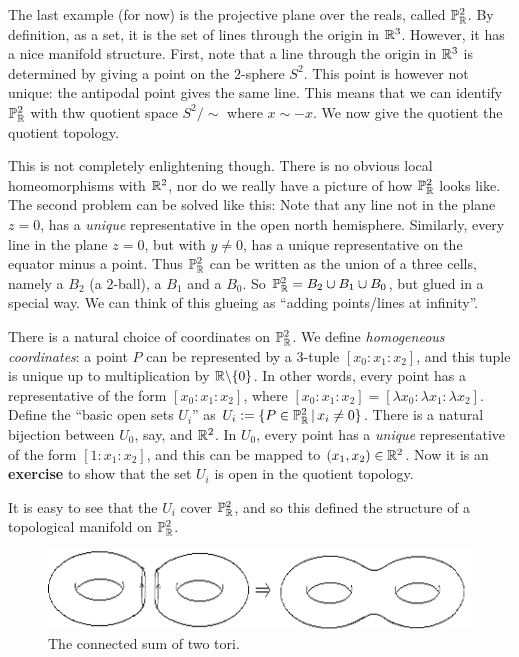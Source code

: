 \documentclass[11pt, english]{article}
\begin{document}
\begin{example}
The last example (for now) is the projective plane over the reals, called $\mathbb{P} _{\mathbb{R}} ^2$. By definition, as a set, it is the set of lines through the origin in $\mathbb{R}^3$. However, it has a nice manifold structure. First, note that a line through the origin in $\mathbb{R}^3$ is determined by giving a point on the $2$-sphere $S^2$. This point is however not unique: the antipodal point gives the same line. This means that we can identify $\mathbb{P}_{\mathbb{R}}^2$ with thw quotient space $S^2 / \sim$ where $x \sim -x$. We now give the quotient the quotient topology.

This is not completely enlightening though. There is no obvious local homeomorphisms with $\mathbb{R}^2$, nor do we really have a picture of how $\mathbb{P}_{\mathbb{R}}^2$ looks like. The second problem can be solved like this: Note that any line not in the plane $z=0$, has a \emph{unique} representative in the open north hemisphere. Similarly, every line in the plane $z=0$, but with $y \neq 0$, has a unique representative on the equator minus a point. Thus $\mathbb{P}_{\mathbb{R}}^2$ can be written as the union of a three cells, namely a $B_2$ (a $2$-ball), a $B_1$ and a $B_0$. So $\mathbb{P}_{\mathbb{R}}^2 = B_2 \cup B_1 \cup B_0$, but glued in a special way. We can think of this glueing as ``adding points/lines at infinity''.

There is a natural choice of coordinates on $\mathbb{P}_{\mathbb{R}}^2$. We define \emph{homogeneous coordinates}: a point $P$ can be represented by a $3$-tuple $[x_0:x_1:x_2]$, and this tuple is unique up to multiplication by $\mathbb{R} \backslash \{ 0\}$. In other words, every point has a representative of the form $[x_0:x_1:x_2]$, where $[x_0:x_1:x_2]=[\lambda x_0:\lambda x_1:\lambda x_2]$. Define the ``basic open sets $U_i$'' as $U_i:= \{ P \in \mathbb{P}_{\mathbb{R}}^2 \, | \, x_i \neq 0 \}$. There is a natural bijection between $U_0$, say, and $\mathbb{R}^2$. In $U_0$, every point has a \emph{unique} representative of the form $[1:x_1:x_2]$, and this can be mapped to $(x_1,x_2) \in \mathbb{R}^2$. Now it is an \textbf{exercise} to show that the set $U_i$ is open in the quotient topology.

It is easy to see that the $U_i$ cover $\mathbb{P}_{\mathbb{R}}^2$, and so this defined the structure of a topological manifold on $\mathbb{P}_{\mathbb{R}}^2$.
\end{example}


\begin{figure}[h]
\begin{center}
\includegraphics[scale=0.5]{connected}
\end{center}
\caption{The connected sum of two tori.}
\label{fig:connected}
\end{figure}
\end{document}
